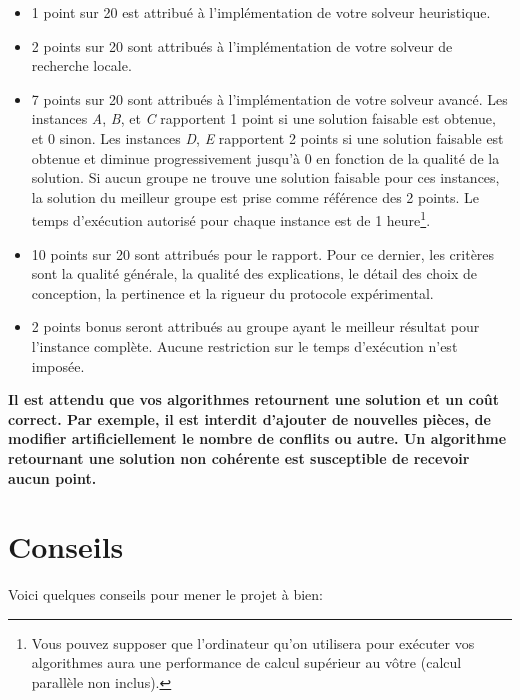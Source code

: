 \documentclass[a4paper,11pt,final,fleqn]{article}
\begin{document}
\begin{itemize}
\item 1 point sur 20 est attribué à l'implémentation de votre solveur heuristique. 
\item 2 points sur 20 sont attribués à l'implémentation de votre solveur de recherche locale.
\item 7 points sur 20 sont attribués à l'implémentation de votre solveur avancé. 
Les instances \textit{A}, \textit{B}, et \textit{C} rapportent 1 point si une solution faisable est obtenue, et 0 sinon. Les instances  \textit{D}, \textit{E} rapportent 2 points si une solution faisable est obtenue et diminue progressivement jusqu'à 0 en fonction de la qualité de la solution. 
Si aucun groupe ne trouve une solution faisable pour ces instances, la solution du meilleur groupe est prise comme référence des 2 points.
Le temps d'exécution autorisé pour chaque instance est de 1 heure\footnote{Vous pouvez supposer que l'ordinateur qu'on utilisera pour exécuter vos algorithmes aura une performance de calcul supérieur au vôtre (calcul parallèle non inclus).}.
\item 10 points sur 20 sont attribués pour le rapport.  Pour ce dernier, les critères sont la qualité générale, la qualité des explications, le détail des choix de conception, la pertinence et la rigueur du protocole expérimental.
\item 2 points bonus seront attribués au groupe ayant le meilleur résultat pour l'instance complète. Aucune restriction sur le temps d'exécution n'est imposée.
\end{itemize}

\textbf{\danger Il est attendu que vos algorithmes retournent une solution et un coût correct. Par exemple, il est interdit d'ajouter de nouvelles pièces, de modifier artificiellement le nombre de conflits ou autre. Un algorithme retournant une solution non cohérente est susceptible de recevoir aucun point.}

\section*{Conseils}

Voici quelques conseils pour mener le projet à bien:
\end{document}
